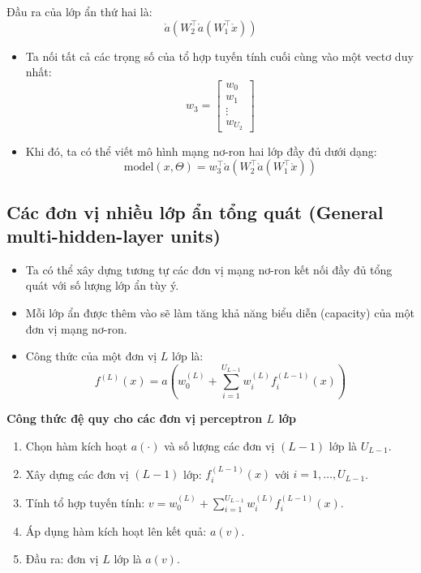 \documentclass{book}
\begin{document}
    Đầu ra của lớp ẩn thứ hai là:
    \[
    \mathring{a}\left(W_2^\top \mathring{a}\left(W_1^\top \mathring{x}\right)\right)
    \]
    \begin{itemize}
        \item Ta nối tất cả các trọng số của tổ hợp tuyến tính cuối cùng vào một vectơ duy nhất:
        \[
        w_3 = 
        \begin{bmatrix}
        w_0 \\
        w_1 \\
        \vdots \\
        w_{U_2}
        \end{bmatrix}
        \]
        
        \item Khi đó, ta có thể viết mô hình mạng nơ-ron hai lớp đầy đủ dưới dạng:
        \[
        \text{model}(x, \Theta) = w_3^\top \mathring{a}\left(W_2^\top \mathring{a}\left(W_1^\top \mathring{x}\right)\right)
        \]
    \end{itemize}

    \subsection{Các đơn vị nhiều lớp ẩn tổng quát (General multi-hidden-layer units)}
    \begin{itemize}
        \item Ta có thể xây dựng tương tự các đơn vị mạng nơ-ron kết nối đầy đủ tổng quát với số lượng lớp ẩn tùy ý.
        \item Mỗi lớp ẩn được thêm vào sẽ làm tăng khả năng biểu diễn (capacity) của một đơn vị mạng nơ-ron.
        \item Công thức của một đơn vị \( L \) lớp là:
        \[
        f^{(L)}(x) = a\left(w^{(L)}_0 + \sum_{i=1}^{U_{L-1}} w^{(L)}_i f^{(L-1)}_i(x) \right)
        \]
    \end{itemize}
    
    \textbf{Công thức đệ quy cho các đơn vị perceptron \( L \) lớp}
    
    \begin{enumerate}
        \item Chọn hàm kích hoạt \( a(\cdot) \) và số lượng các đơn vị \( (L-1) \) lớp là \( U_{L-1} \).
        \item Xây dựng các đơn vị \( (L-1) \) lớp: \( f^{(L-1)}_i(x) \) với \( i = 1, \ldots, U_{L-1} \).
        \item Tính tổ hợp tuyến tính: \( v = w^{(L)}_0 + \sum_{i=1}^{U_{L-1}} w^{(L)}_i f^{(L-1)}_i(x) \).
        \item Áp dụng hàm kích hoạt lên kết quả: \( a(v) \).
        \item Đầu ra: đơn vị \( L \) lớp là \( a(v) \).
    \end{enumerate}
\end{document}
